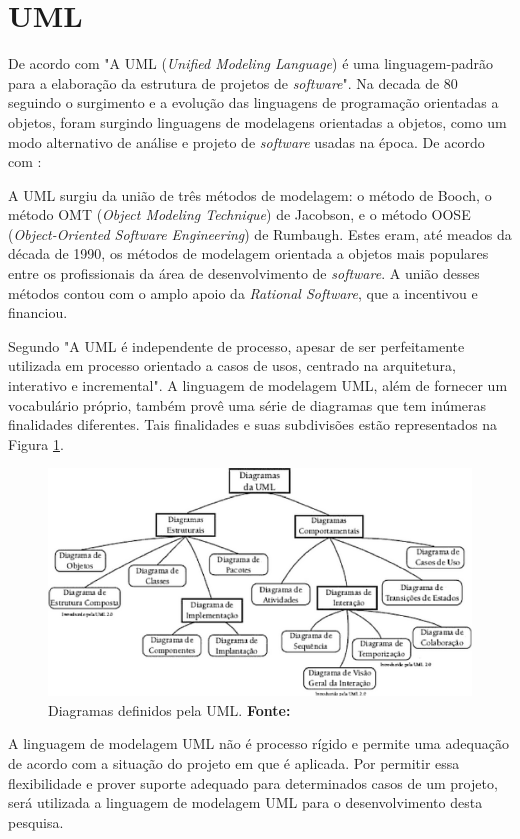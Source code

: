\section{UML}
		
	\par De acordo com  "A UML (\textit{Unified Modeling
Language}) é uma linguagem-padrão para a elaboração da estrutura de projetos
de \textit{software}". Na decada de 80 seguindo o surgimento e a evolução das
linguagens de programação orientadas a objetos, foram surgindo linguagens de
modelagens orientadas a objetos, como um modo alternativo de análise e projeto
de \textit{software} usadas na época. De acordo com
:
	\begin{citacao}
		A UML surgiu da união de três métodos de modelagem: o método de Booch, o
		método OMT (\textit{Object Modeling Technique}) de Jacobson, e o método OOSE
		(\textit{Object-Oriented Software Engineering}) de Rumbaugh. Estes eram, até
		meados da década de 1990, os métodos de modelagem orientada a objetos mais
		populares entre os profissionais da área de desenvolvimento de
		\textit{software}. A união desses métodos contou com o amplo apoio da
		\textit{Rational Software}, que a incentivou e financiou.
	\end{citacao}

	\par Segundo  "A UML é independente de processo,
apesar de ser perfeitamente utilizada em processo orientado a casos de usos,
centrado na arquitetura, interativo e incremental". A linguagem de modelagem
UML, além de fornecer um vocabulário próprio, também provê uma série de
diagramas que tem inúmeras finalidades diferentes. Tais finalidades e suas
subdivisões estão representados na Figura \ref{fig:qt4}.
		
	\begin{figure}[h!]
		\centerline{\includegraphics[scale=1]{./imagens/1_q_teorico/qt4.png}}
		\caption[Principais Diagramas definidos pela UML.]{Diagramas definidos pela
		UML. \textbf{Fonte:}}
		\label{fig:qt4}
	\end{figure}
	\pagebreak
	
	\par A linguagem de modelagem UML não é processo rígido e permite uma
adequação de acordo com a situação do projeto em que é aplicada. Por permitir
essa flexibilidade e prover suporte adequado para determinados casos de um
projeto, será utilizada a linguagem de modelagem UML  para o desenvolvimento
desta pesquisa.